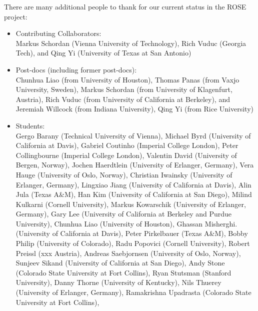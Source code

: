      There are many additional people to thank for our current status in 
the ROSE project:
\begin{itemize}
     \item Contributing Collaborators: \\
           Markus Schordan (Vienna University of Technology),
           Rich Vuduc (Georgia Tech), and
           Qing Yi (University of Texas at San Antonio)
     \item Post-docs (including former post-docs): \\
           Chunhua Liao (from University of Houston),
           Thomas Panas (from Vaxjo University, Sweden),
           Markus Schordan (from University of Klagenfurt, Austria),
           Rich Vuduc (from University of California at Berkeley), and
           Jeremiah Willcock (from Indiana University),
           Qing Yi (from Rice University)
     \item Students: \\
           Gergo Barany (Technical University of Vienna),
           Michael Byrd (University of California at Davis),
           Gabriel Coutinho (Imperial College London),
           Peter Collingbourne (Imperial College London),
           Valentin David (University of Bergen, Norway),
           Jochen Haerdtlein (University of Erlanger, Germany),
           Vera Hauge (University of Oslo, Norway),
           Christian Iwainsky (University of Erlanger, Germany),
           Lingxiao Jiang (University of California at Davis),
           Alin Jula (Texas A\&M),
           Han Kim (University of California at San Diego),
           Milind Kulkarni (Cornell University),
           Markus Kowarschik (University of Erlanger, Germany),
           Gary Lee (University of California at Berkeley and Purdue University),
           Chunhua Liao (University of Houston),
           Ghassan Misherghi. (University of California at Davis),
           Peter Pirkelbauer (Texas A\&M),
           Bobby Philip (University of Colorado),
           Radu Popovici (Cornell University),
           Robert Preissl (xxx Austria),
           Andreas Saebjornsen (University of Oslo, Norway),
           Sunjeev Sikand (University of California at San Diego),
           Andy Stone (Colorado State University at Fort Collins),
           Ryan Stutsman (Stanford University),
           Danny Thorne (University of Kentucky), 
           Nils Thuerey (University of Erlanger, Germany), 
           Ramakrishna Upadrasta (Colorado State University at Fort Collins),

\end{itemize}
